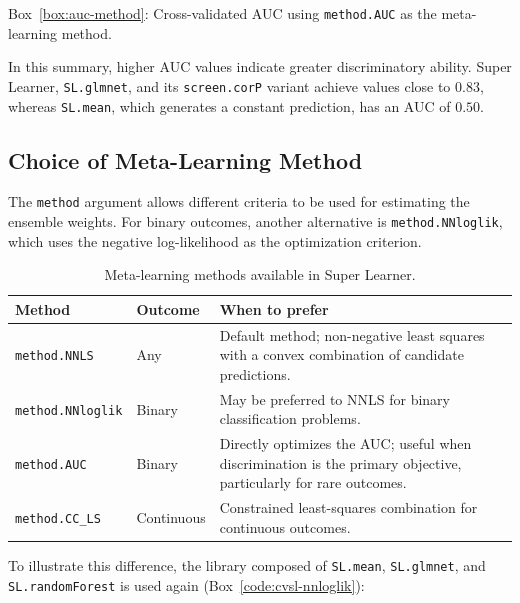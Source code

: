 \documentclass[12pt]{article}
\newcommand{\routputcaption}[2]{%
    \par\smallskip
    \begin{center}
        Box~\ref{#1}: #2
    \end{center}
}
\begin{document}
\routputcaption{box:auc-method}
{Cross-validated AUC using \texttt{method.AUC} as the meta-learning method.}

In this summary, higher AUC values indicate greater discriminatory ability. Super Learner, \texttt{SL.glmnet}, and its \texttt{screen.corP} variant achieve values close to $0.83$, whereas \texttt{SL.mean}, which generates a constant prediction, has an AUC of $0.50$.

\subsection{Choice of Meta-Learning Method}

The \texttt{method} argument allows different criteria to be used for estimating the ensemble weights. For binary outcomes, another alternative is \texttt{method.NNloglik}, which uses the negative log-likelihood as the optimization criterion.

    \begin{table}[H]
    	\centering
    	\caption{Meta-learning methods available in Super Learner.}
    	\label{tab:meta_methods}
    	\begin{tabularx}{\textwidth}{l l X}
    		\toprule
    		\textbf{Method} & \textbf{Outcome} & \textbf{When to prefer} \\
    		\midrule
    		\texttt{method.NNLS}
    		& Any
    		& Default method; non-negative least squares with a convex combination of candidate predictions. \\
    		
    		\texttt{method.NNloglik}
    		& Binary
    		& May be preferred to NNLS for binary classification problems. \\
    		
    		\texttt{method.AUC}
    		& Binary
    		& Directly optimizes the AUC; useful when discrimination is the primary objective, particularly for rare outcomes. \\
    		
    		\texttt{method.CC\_LS}
    		& Continuous
    		& Constrained least-squares combination for continuous outcomes. \\
    		\bottomrule
    	\end{tabularx}
    \end{table}

To illustrate this difference, the library composed of \texttt{SL.mean}, \texttt{SL.glmnet}, and \texttt{SL.randomForest} is used again (Box~\ref{code:cvsl-nnloglik}):
\end{document}
